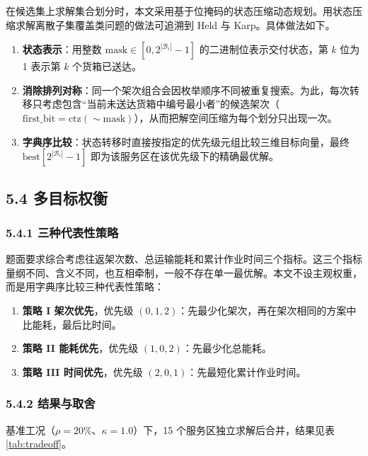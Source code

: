 \documentclass[withoutpreface,bwprint]{format}
\begin{document}
在候选集上求解集合划分时，本文采用基于位掩码的状态压缩动态规划。用状态压缩求解离散子集覆盖类问题的做法可追溯到 Held 与 Karp\cite{held1962}。具体做法如下。

\begin{enumerate}[leftmargin=*]
    \item \textbf{状态表示}：用整数 $\text{mask} \in [0, 2^{|\mathcal{B}_i|}-1]$ 的二进制位表示交付状态，第 $k$ 位为 1 表示第 $k$ 个货箱已送达。
    \item \textbf{消除排列对称}：同一个架次组合会因枚举顺序不同被重复搜索。为此，每次转移只考虑包含“当前未送达货箱中编号最小者”的候选架次（$\text{first\_bit} = \text{ctz}(\sim \text{mask})$），从而把解空间压缩为每个划分只出现一次。
    \item \textbf{字典序比较}：状态转移时直接按指定的优先级元组比较三维目标向量，最终 $\text{best}[2^{|\mathcal{B}_i|}-1]$ 即为该服务区在该优先级下的精确最优解。
\end{enumerate}

\subsection{5.4 多目标权衡}

\subsubsection{5.4.1 三种代表性策略}
题面要求综合考虑往返架次数、总运输能耗和累计作业时间三个指标。这三个指标量纲不同、含义不同，也互相牵制，一般不存在单一最优解。本文不设主观权重，而是用字典序比较三种代表性策略\cite{ehrgott2005, marler2004}：

\begin{enumerate}[leftmargin=*]
    \item \textbf{策略 I 架次优先}，优先级 $(0,1,2)$：先最少化架次，再在架次相同的方案中比能耗，最后比时间。
    \item \textbf{策略 II 能耗优先}，优先级 $(1,0,2)$：先最少化总能耗。
    \item \textbf{策略 III 时间优先}，优先级 $(2,0,1)$：先最短化累计作业时间。
\end{enumerate}

\subsubsection{5.4.2 结果与取舍}
基准工况（$\rho=20\%$、$\kappa=1.0$）下，15 个服务区独立求解后合并，结果见表 \ref{tab:tradeoff}。
\end{document}
